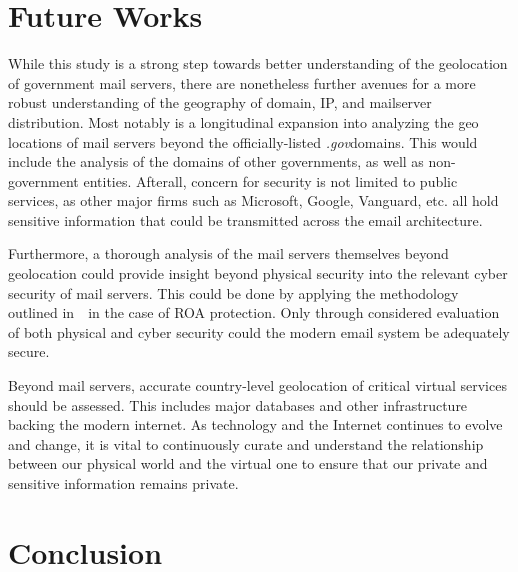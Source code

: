 \documentclass{hotnets21}
\newcommand{\dotgov}{\textit{.gov}\space}
\begin{document}
\section{Future Works}

While this study is a strong step towards better understanding of the geolocation of government mail servers, there are nonetheless further avenues for a more robust understanding of the geography of domain, IP, and mailserver distribution.
Most notably is a longitudinal expansion into analyzing the geo locations of mail servers beyond the officially-listed \dotgov domains.
This would include the analysis of the domains of other governments, as well as non-government entities.
Afterall, concern for security is not limited to public services, as other major firms such as Microsoft, Google, Vanguard, etc. all hold sensitive information that could be transmitted across the email architecture.

Furthermore, a thorough analysis of the mail servers themselves beyond geolocation could provide insight beyond physical security into the relevant cyber security of mail servers.
This could be done by applying the methodology outlined in~\cite{bartoli}~in the case of ROA protection.
Only through considered evaluation of both physical and cyber security could the modern email system be adequately secure.

Beyond mail servers, accurate country-level geolocation of critical virtual services should be assessed.
This includes major databases and other infrastructure backing the modern internet.
As technology and the Internet continues to evolve and change, it is vital to continuously curate and understand the relationship between our physical world and the virtual one to ensure that our private and sensitive information remains private.

\section{Conclusion}


 
\begin{small}

\end{small}
\end{document}
